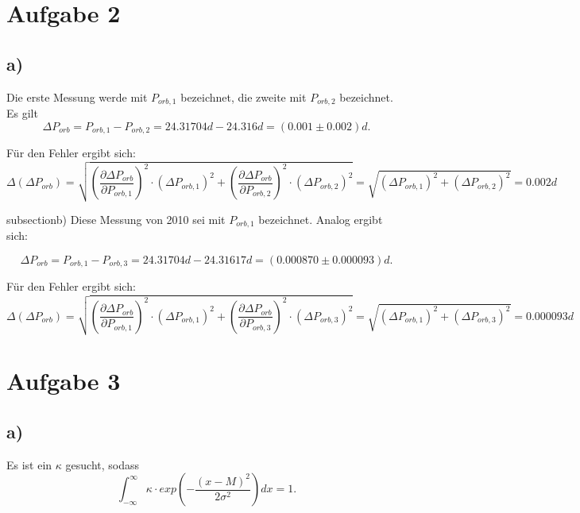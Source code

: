\documentclass[titlepage]{scrartcl}
\begin{document}
\section{Aufgabe 2} 
\subsection{a)} 
Die erste Messung werde mit $P_{orb, 1}$ bezeichnet, die zweite mit $P_{orb,2}$ bezeichnet. 
Es gilt 
\begin{equation}
\Delta P_{orb} = P_{orb, 1} - P_{orb, 2} = 24.31704 d - 24.316 d = (0.001 \pm 0.002) d.
\end{equation} 

Für den Fehler ergibt sich: 
\begin{equation}
\Delta (\Delta P_{orb}) = \sqrt{(\frac{\partial \Delta P_{orb}}{\partial P_{orb, 1}})^2 \cdot (\Delta P_{orb, 1})^2 + (\frac{\partial \Delta P_{orb}}{\partial P_{orb, 2}})^2 \cdot (\Delta P_{orb, 2})^2} = \sqrt{(\Delta P_{orb, 1})^2 + (\Delta P_{orb, 2})^2} = 0.002 d
\end{equation}

subsection{b)}
Diese Messung von 2010 sei mit $P_{orb, 1}$ bezeichnet. 
Analog ergibt sich: 

\begin{equation}
\Delta P_{orb} = P_{orb, 1} - P_{orb, 3} = 24.31704 d - 24.31617 d = (0.000870 \pm 0.000093) d.
\end{equation}

Für den Fehler ergibt sich: 
\begin{equation}
\Delta (\Delta P_{orb}) = \sqrt{(\frac{\partial \Delta P_{orb}}{\partial P_{orb, 1}})^2 \cdot (\Delta P_{orb, 1})^2 + (\frac{\partial \Delta P_{orb}}{\partial P_{orb, 3}})^2 \cdot (\Delta P_{orb, 3})^2} = \sqrt{(\Delta P_{orb, 1})^2 + (\Delta P_{orb, 3})^2} = 0.000093 d
\end{equation}

\section{Aufgabe 3}
\subsection{a)}
Es ist ein $\kappa$ gesucht, sodass
\begin{equation}
\int_{-\infty}^{\infty} \kappa \cdot exp(-\frac{(x-M)^2}{2\sigma^2}) dx = 1.
\end{equation}
\end{document}
